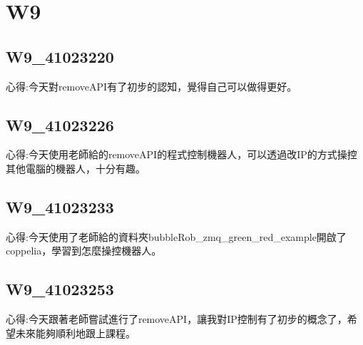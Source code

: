 \chapter{W9}


\section{W9\_41023220}

心得:今天對removeAPI有了初步的認知，覺得自己可以做得更好。

\section{W9\_41023226}

心得:今天使用老師給的removeAPI的程式控制機器人，可以透過改IP的方式操控其他電腦的機器人，十分有趣。

\section{W9\_41023233}

心得:今天使用了老師給的資料夾bubbleRob_zmq_green_red_example開啟了coppelia，學習到怎麼操控機器人。

\section{W9\_41023253}

心得:今天跟著老師嘗試進行了removeAPI，讓我對IP控制有了初步的概念了，希望未來能夠順利地跟上課程。

